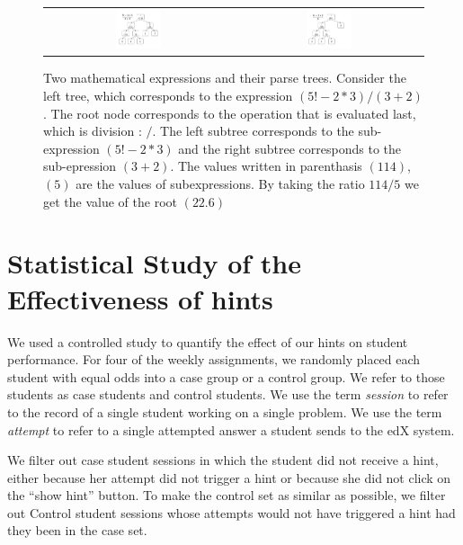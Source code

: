 \documentclass{sigchi/sigchi}
\begin{document}
\begin{figure}[ht]
  \centering
   \begin{tabular}{c c}
		\includegraphics[width=0.25\textwidth]{image/ParseTrees1.png} &
		\includegraphics[width=0.25\textwidth]{image/ParseTrees2.png}
	\end{tabular}
   \caption{Two mathematical expressions and their parse
     trees. Consider the left tree, which corresponds to the
     expression $(5!-2*3)/(3+2)$. The root node corresponds to the
     operation that is evaluated last, which is division : $/$. The
     left subtree corresponds to the sub-expression $(5!-2*3)$ and the
     right subtree corresponds to the sub-epression $(3+2)$. The
     values written in parenthasis $(114)$,$(5)$ are the values of
     subexpressions. By taking the ratio $114/5$ we get the value of
     the root $(22.6)$}
   \label{fig:parse_tree}
\end{figure}

\section{Statistical Study of the Effectiveness of hints}

We used a controlled study to quantify the effect of our hints on
student performance. For four of the weekly assignments, we randomly
placed each student with equal odds into a case group or a control
group. We refer to those students as case students and control
students.  We use the term {\em session} to refer to the record of a
single student working on a single problem. We use the term {\em
  attempt} to refer to a single attempted answer a student sends to
the edX system.

We filter out case student sessions in which the student did not
receive a hint, either because her attempt did not trigger a hint or
because she did not click on the ``show hint'' button.  To make the
control set as similar as possible, we filter out Control student
sessions whose attempts would not have triggered a hint had they been
in the case set.
\end{document}
